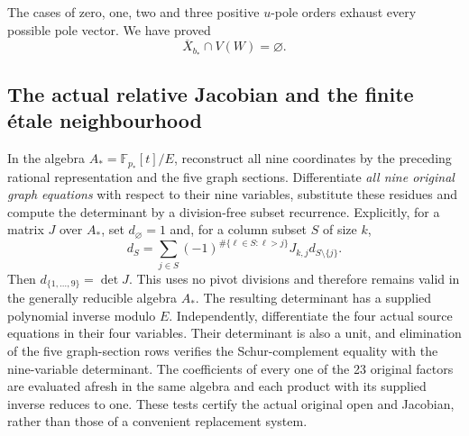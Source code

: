 \documentclass[11pt,a4paper]{article}
\theoremstyle{remark}\newtheorem{remark}[theorem]{Remark}
\begin{document}
The cases of zero, one, two and three positive $u$-pole orders exhaust
every possible pole vector. We have proved
\begin{equation}\label{generic:noinfinity}
 \overline X_{b_*}\cap V(W)=\varnothing.
\end{equation}

\subsection{The actual relative Jacobian and the finite \texorpdfstring{\'etale}{etale} neighbourhood}
\label{generic:jacobian}
In the algebra $A_*=\mathbb F_{p_*}[t]/E$, reconstruct all nine
coordinates by the preceding rational representation and the five graph
sections. Differentiate \emph{all nine original graph equations} with
respect to their nine variables, substitute these residues and compute
the determinant by a division-free subset recurrence. Explicitly, for a
matrix $J$ over $A_*$, set $d_\varnothing=1$ and, for a column subset
$S$ of size $k$,
\[
 d_S=\sum_{j\in S}(-1)^{\#\{\ell\in S:\ell>j\}}
                  J_{k,j}d_{S\setminus\{j\}}.
\]
Then $d_{\{1,\ldots,9\}}=\det J$. This uses no pivot divisions and
therefore remains valid in the generally reducible algebra $A_*$.
The resulting determinant has a supplied polynomial inverse modulo $E$.
Independently, differentiate the four actual source equations in their
four variables. Their determinant is also a unit, and elimination of the
five graph-section rows verifies the Schur-complement equality with the
nine-variable determinant. The coefficients of every one of the 23
original factors are evaluated afresh in the same algebra and each
product with its supplied inverse reduces to one. These tests certify
the actual original open and Jacobian, rather than those of a convenient
replacement system.
\end{document}
